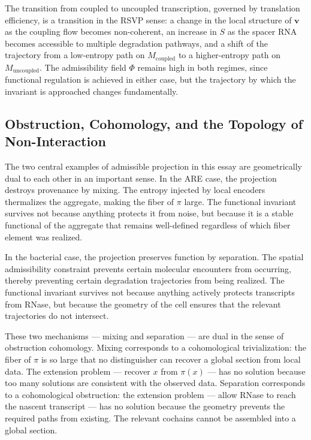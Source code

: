 \documentclass[12pt, a4paper]{article}
\theoremstyle{essaystyle}
\begin{document}
The transition from coupled to uncoupled transcription, governed by translation
efficiency, is a transition in the RSVP sense: a change in the local structure of
$\mathbf{v}$ as the coupling flow becomes non-coherent, an increase in $S$ as the
spacer RNA becomes accessible to multiple degradation pathways, and a shift of the
trajectory from a low-entropy path on $M_{\mathrm{coupled}}$ to a higher-entropy path
on $M_{\mathrm{uncoupled}}$. The admissibility field $\Phi$ remains high in both
regimes, since functional regulation is achieved in either case, but the trajectory
by which the invariant is approached changes fundamentally.

\subsection{Obstruction, Cohomology, and the Topology of Non-Interaction}

The two central examples of admissible projection in this essay are geometrically dual
to each other in an important sense. In the ARE case, the projection destroys provenance
by mixing. The entropy injected by local encoders thermalizes the aggregate, making the
fiber of $\pi$ large. The functional invariant survives not because anything protects it
from noise, but because it is a stable functional of the aggregate that remains
well-defined regardless of which fiber element was realized.

In the bacterial case, the projection preserves function by separation. The spatial
admissibility constraint prevents certain molecular encounters from occurring, thereby
preventing certain degradation trajectories from being realized. The functional invariant
survives not because anything actively protects transcripts from RNase, but because the
geometry of the cell ensures that the relevant trajectories do not intersect.

These two mechanisms --- mixing and separation --- are dual in the sense of obstruction
cohomology. Mixing corresponds to a cohomological trivialization: the fiber of $\pi$ is
so large that no distinguisher can recover a global section from local data. The
extension problem --- recover $x$ from $\pi(x)$ --- has no solution because too many
solutions are consistent with the observed data. Separation corresponds to a
cohomological obstruction: the extension problem --- allow RNase to reach the nascent
transcript --- has no solution because the geometry prevents the required paths from
existing. The relevant cochains cannot be assembled into a global section.
\end{document}

